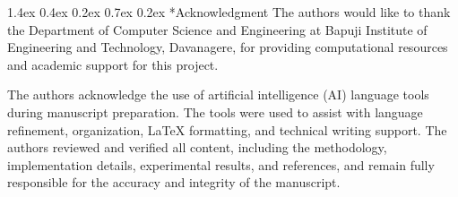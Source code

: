 \documentclass[10pt,conference]{IEEEtran}
\makeatletter
\renewcommand\section{\@startsection{section}{1}{\z@}%
  {1.4ex \@plus 0.4ex \@minus 0.2ex}%
  {0.7ex \@plus 0.2ex}%
  {\normalfont\fontsize{12pt}{14.4pt}\selectfont\bfseries\centering}}
\makeatother
\begin{document}
\section*{Acknowledgment}
The authors would like to thank the Department of Computer Science and Engineering at Bapuji Institute of Engineering and Technology, Davanagere, for providing computational resources and academic support for this project.

The authors acknowledge the use of artificial intelligence (AI) language tools during manuscript preparation. The tools were used to assist with language refinement, organization, LaTeX formatting, and technical writing support. The authors reviewed and verified all content, including the methodology, implementation details, experimental results, and references, and remain fully responsible for the accuracy and integrity of the manuscript.
\end{document}
